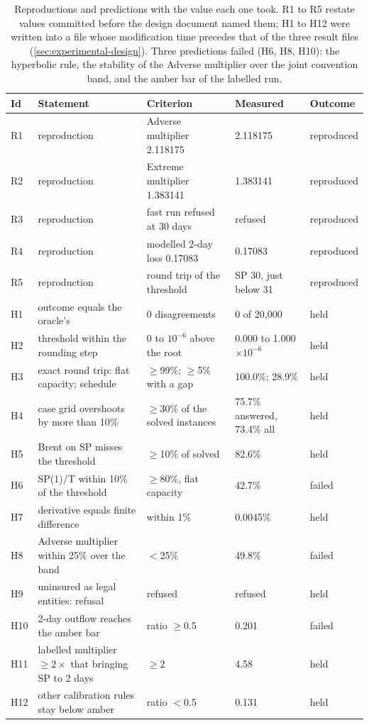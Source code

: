 \begin{table}[htbp]
\centering
\small
\setlength{\tabcolsep}{3pt}
\caption{Reproductions and predictions with the value each one took. R1 to R5 restate values committed before the design document named them; H1 to H12 were written into a file whose modification time precedes that of the three result files (\cref{sec:experimental-design}). Three predictions failed (H6, H8, H10): the hyperbolic rule, the stability of the Adverse multiplier over the joint convention band, and the amber bar of the labelled run.}
\label{tab:hypotheses}
\begin{tabular}{lp{4.6cm}p{3.0cm}p{3.4cm}l}
\toprule
Id & Statement & Criterion & Measured & Outcome \\
\midrule
R1 & reproduction & Adverse multiplier 2.118175 & 2.118175 & reproduced \\
R2 & reproduction & Extreme multiplier 1.383141 & 1.383141 & reproduced \\
R3 & reproduction & fast run refused at 30 days & refused & reproduced \\
R4 & reproduction & modelled 2-day loss 0.17083 & 0.17083 & reproduced \\
R5 & reproduction & round trip of the threshold & SP 30, just below 31 & reproduced \\
H1 & outcome equals the oracle's & 0 disagreements & 0 of 20,000 & held \\
H2 & threshold within the rounding step & 0 to $10^{-6}$ above the root & 0.000 to 1.000 $\times10^{-6}$ & held \\
H3 & exact round trip: flat capacity; schedule & $\ge$99\%; $\ge$5\% with a gap & 100.0\%; 28.9\% & held \\
H4 & case grid overshoots by more than 10\% & $\ge$30\% of the solved instances & 75.7\% answered, 73.4\% all & held \\
H5 & Brent on SP misses the threshold & $\ge$10\% of solved & 82.6\% & held \\
H6 & SP(1)/T within 10\% of the threshold & $\ge$80\%, flat capacity & 42.7\% & failed \\
H7 & derivative equals finite difference & within 1\% & 0.0045\% & held \\
H8 & Adverse multiplier within 25\% over the band & $<$25\% & 49.8\% & failed \\
H9 & uninsured as legal entities: refusal & refused & refused & held \\
H10 & 2-day outflow reaches the amber bar & ratio $\ge$0.5 & 0.201 & failed \\
H11 & labelled multiplier $\ge2\times$ that bringing SP to 2 days & $\ge$2 & 4.58 & held \\
H12 & other calibration rules stay below amber & ratio $<$0.5 & 0.131 & held \\
\bottomrule
\end{tabular}
\end{table}
